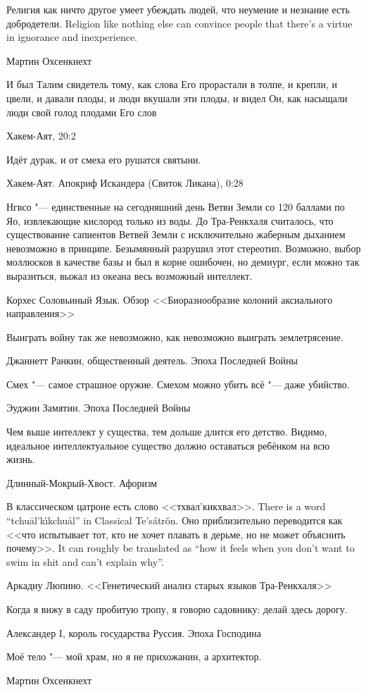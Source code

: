 \epigraph{
{Религия как ничто другое умеет убеждать людей, что неумение и незнание есть добродетели.}
{Religion like nothing else can convince people that there's a virtue in ignorance and inexperience.}
}{
Мартин Охсенкнехт
}

\epigraph
{\ldotst И был Талим свидетель тому, как слова Его прорастали в толпе, и крепли, и цвели, и давали плоды, и люди вкушали эти плоды, и видел Он, как насыщали люди свой голод плодами Его слов\ldotst}
{Хакем-Аят, 20:2}

\epigraph
{Идёт дурак, и от смеха его рушатся святыни.}
{Хакем-Аят. Апокриф Искандера (Свиток Ликана), 0:28}

\epigraph
{Нгвсо "--- единственные на сегодняшний день Ветви Земли со 120 баллами по Яо, извлекающие кислород только из воды.
До Тра-Ренкхаля считалось, что существование сапиентов Ветвей Земли с исключительно жаберным дыханием невозможно в принципе.
Безымянный разрушил этот стереотип.
Возможно, выбор моллюсков в качестве базы и был в корне ошибочен, но демиург, если можно так выразиться, выжал из океана весь возможный интеллект.}
{Корхес Соловьиный Язык.
Обзор <<Биоразнообразие колоний аксиального направления>>}

\epigraph
{Выиграть войну так же невозможно, как невозможно выиграть землетрясение.}
{Джаннетт Ранкин, общественный деятель.
Эпоха Последней Войны}

\epigraph
{Смех "--- самое страшное оружие.
Смехом можно убить всё "--- даже убийство.}
{Эуджин Замятин.
Эпоха Последней Войны}

\epigraph
{Чем выше интеллект у существа, тем дольше длится его детство.
Видимо, идеальное интеллектуальное существо должно оставаться ребёнком на всю жизнь.}
{Длинный-Мокрый-Хвост.
Афоризм}

\epigraph{
{В классическом цатроне есть слово <<тхвал'кикхвал>>.}
{There is a word ``tchu\={a}l'k\'{\i}kchu\r{a}l'' in Classical Te's\'{a}tr\v{o}n.}
{Оно приблизительно переводится как <<что испытывает тот, кто не хочет плавать в дерьме, но не может объяснить почему>>.}
{It can roughly be translated as ``how it feels when you don't want to swim in shit and can't explain why''.}
}{
Аркадиу Люпино.
<<Генетический анализ старых языков Тра-Ренкхаля>>
}

\epigraph
{Когда я вижу в саду пробитую тропу, я говорю садовнику: делай здесь дорогу.}
{Александер I, король государства Руссия.
Эпоха Господина}

\epigraph
{Моё тело "--- мой храм, но я не прихожанин, а архитектор.}
{Мартин Охсенкнехт}

